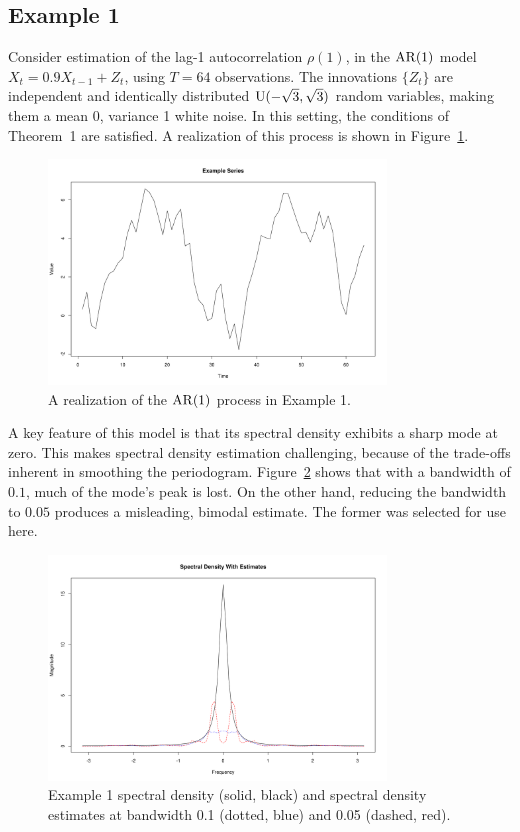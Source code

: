 \subsection*{Example 1}
Consider estimation of the lag-1 autocorrelation $\rho(1)$,
in the $\operatorname{AR}(1)$ model $X_t = 0.9 X_{t-1} + Z_t$,
using $T = 64$ observations.
The innovations $\{Z_t\}$ are independent and identically distributed
$\operatorname{U}(-\sqrt{3}, \sqrt{3})$ random variables,
making them a mean 0, variance 1 white noise.
In this setting, the conditions of Theorem~1 are satisfied.
A realization of this process is shown in Figure~\ref{ex1}.
    \begin{figure}[ht]
    \centering
    \includegraphics[width = 0.8\textwidth]{../res/ex1.png}
    \caption{
        A realization of the $\operatorname{AR}(1)$ process in Example 1.
        }
    \label{ex1}
    \end{figure}

A key feature of this model is that its spectral density exhibits a sharp
mode at zero.
This makes spectral density estimation challenging,
because of the trade-offs inherent in smoothing the periodogram.
Figure~\ref{ex1_spec} shows that with a bandwidth of $0.1$,
much of the mode's peak is lost.
On the other hand, reducing the bandwidth to $0.05$ produces a misleading,
bimodal estimate.
The former was selected for use here.
    \begin{figure}[ht]
    \centering
    \includegraphics[width = 0.8\textwidth]{../res/ex1_spec.png}
    \caption{
        Example 1
        spectral density (solid, black) and spectral density estimates
        at bandwidth 0.1 (dotted, blue) and 0.05 (dashed, red).
        }
    \label{ex1_spec}
    \end{figure}

